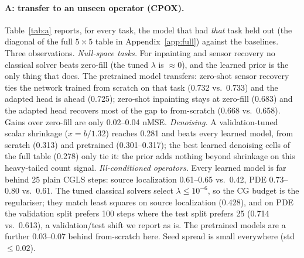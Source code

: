 \documentclass{article}
\begin{document}
\paragraph{A: transfer to an unseen operator (CPOX).}
Table~\ref{tab:a} reports, for every task, the model that had \emph{that} task held out (the diagonal of the
full $5 \times 5$ table in Appendix~\ref{app:full}) against the baselines. Three observations.
\emph{Null-space tasks.} For inpainting and sensor recovery no classical solver beats zero-fill (the tuned
$\lambda$ is $\approx 0$), and the learned prior is the only thing that does. The pretrained model transfers: zero-shot
sensor recovery ties the network trained from scratch on that task (0.732 vs.\ 0.733) and the adapted head is
ahead (0.725); zero-shot inpainting stays at zero-fill (0.683) and the adapted head recovers most of the gap
to from-scratch (0.668 vs.\ 0.658). Gains over zero-fill are only 0.02--0.04 nMSE.
\emph{Denoising.} A validation-tuned scalar shrinkage ($x = b / 1.32$) reaches 0.281 and beats every learned
model, from scratch (0.313) and pretrained (0.301--0.317); the best learned denoising cells of the full table
(0.278) only tie it: the prior adds nothing beyond shrinkage on this heavy-tailed count signal.
\emph{Ill-conditioned operators.} Every learned model is far behind 25 plain CGLS steps: source localization
0.61--0.65 vs.\ 0.42, PDE 0.73--0.80 vs.\ 0.61. The tuned classical solvers select $\lambda \le 10^{-6}$, so
the CG budget is the regulariser; they match least squares on source localization (0.428), and on PDE the
validation split prefers 100 steps where the test split prefers 25 (0.714 vs.\ 0.613), a validation/test
shift we report as is. The pretrained models are a further 0.03--0.07 behind from-scratch here. Seed spread
is small everywhere (std $\le 0.02$).

\begin{table}[t]
\centering\footnotesize\setlength{\tabcolsep}{4pt}

\caption{Experiment A. CPOX test nMSE (mean $\pm$ std, 3 seeds) of the model with the column's task held out,
against the baselines; best per column in bold. Tuned classical rows use the validation-optimal $(\lambda, \text{CG steps})$.}
\label{tab:a}
\end{table}
\end{document}
